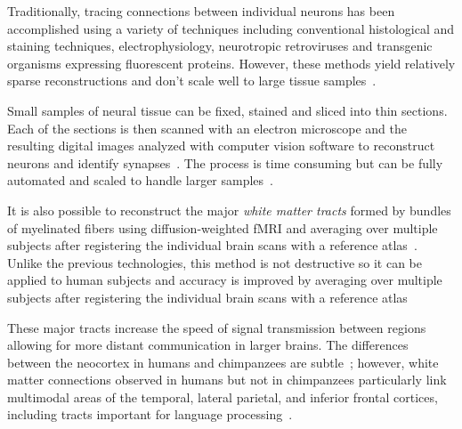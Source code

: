 \documentclass[letterpaper,11pt]{article}
\begin{document}
Traditionally, tracing connections between individual neurons has been accomplished using a variety of techniques including conventional histological and staining techniques, electrophysiology, neurotropic retroviruses and transgenic organisms expressing fluorescent proteins. However, these methods yield relatively sparse reconstructions and don't scale well to large tissue samples~\cite{Arenkiel2014neural,CallawayCURRENT-OPINION-08}.

Small samples of neural tissue can be fixed, stained and sliced into thin sections. Each of the sections is then scanned with an electron microscope and the resulting digital images analyzed with computer vision software to reconstruct neurons and identify synapses~\cite{MikulaandDenkNATURE-METHODS-15}. The process is time consuming but can be fully automated and scaled to handle larger samples~\cite{JanuszewskietalNATURE-METHODS-18,ZhengetalCELL-18}. 

It is also possible to reconstruct the major {\it{white matter tracts}} formed by bundles of myelinated fibers using diffusion-weighted fMRI and averaging over multiple subjects after registering the individual brain scans with a reference atlas~\cite{OishietalNEUROIMAGE-08,WakanaetalRADIOLOGY-04}. Unlike the previous technologies, this method is not destructive so it can be applied to human subjects and accuracy is improved by averaging over multiple subjects after registering the individual brain scans with a reference atlas

These major tracts increase the speed of signal transmission between regions allowing for more distant communication in larger brains. The differences between the neocortex in humans and chimpanzees are subtle~\cite{Mora-BermudezetalELIFE-16}; however, white matter connections observed in humans but not in chimpanzees particularly link multimodal areas of the temporal, lateral parietal, and inferior frontal cortices, including tracts important for language processing~\cite{ArdeschetalPNAS-19,Gomez-RoblesetalPNAS-15}.

\end{document}
